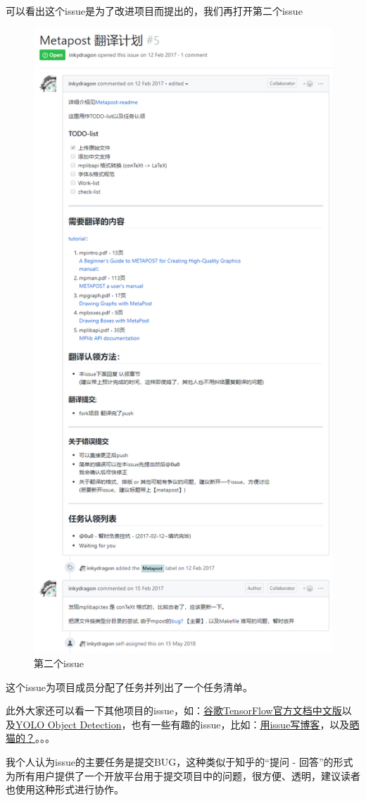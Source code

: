 \documentclass[UTF8,oneside]{ctexbook}
\begin{document}
可以看出这个issue是为了改进项目而提出的，我们再打开第二个issue
\begin{figure}[H]
	\centering
	\includegraphics[width=0.6\linewidth]{Pics/latexcn3.png}
	\vspace{-0.3cm}
	\caption{第二个issue}\label{fig:latexcn1}
\end{figure}

这个issue为项目成员分配了任务并列出了一个任务清单。

此外大家还可以看一下其他项目的issue，如：\href{https://github.com/jikexueyuanwiki/tensorflow-zh/issues}{谷歌TensorFlow官方文档中文版}以及\href{https://github.com/llSourcell/YOLO_Object_Detection/issues}{YOLO Object Detection}，也有一些有趣的issue，比如：\href{https://github.com/geekyouth/geekyouth.github.io/issues}{用issue写博客}，以及\href{https://github.com/sindresorhus/ama/issues/2}{晒猫的？}。。。

我个人认为issue的主要任务是提交BUG，这种类似于知乎的“提问 - 回答”的形式为所有用户提供了一个开放平台用于提交项目中的问题，很方便、透明，建议读者也使用这种形式进行协作。
\end{document}
